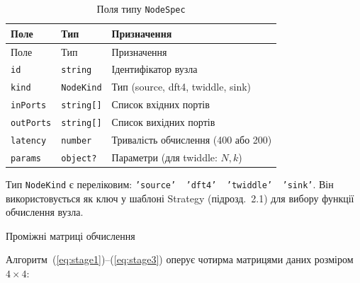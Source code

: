 \begin{longtable}[]{@{}
  >{\raggedright\arraybackslash}p{}
  >{\raggedright\arraybackslash}p{}
  >{\raggedright\arraybackslash}p{}@{}}
\caption{\protect{}\label{tab:nodespec}{}Поля типу
\protect\texttt{NodeSpec}}\tabularnewline
\toprule\noalign{}
\begin{minipage}[b]{\linewidth}\raggedright
Поле
\end{minipage} & \begin{minipage}[b]{\linewidth}\raggedright
Тип
\end{minipage} & \begin{minipage}[b]{\linewidth}\raggedright
Призначення
\end{minipage} \\
\midrule\noalign{}
\endfirsthead
\toprule\noalign{}
\begin{minipage}[b]{\linewidth}\raggedright
Поле
\end{minipage} & \begin{minipage}[b]{\linewidth}\raggedright
Тип
\end{minipage} & \begin{minipage}[b]{\linewidth}\raggedright
Призначення
\end{minipage} \\
\midrule\noalign{}
\endhead
\bottomrule\noalign{}
\endlastfoot
\texttt{id} & \texttt{string} & Ідентифікатор вузла \\
\texttt{kind} & \texttt{NodeKind} & Тип (source, dft4, twiddle, sink) \\
\texttt{inPorts} & \texttt{string{[}{]}} & Список вхідних портів \\
\texttt{outPorts} & \texttt{string{[}{]}} & Список вихідних портів \\
\texttt{latency} & \texttt{number} & Тривалість обчислення (400 або
200) \\
\texttt{params} & \texttt{object?} & Параметри (для twiddle: \(N,k\)) \\
\end{longtable}

Тип \texttt{NodeKind} є переліковим:
\texttt{’source’\ \textbar{}\ ’dft4’\ \textbar{}\ ’twiddle’\ \textbar{}\ ’sink’}.
Він використовується як ключ у шаблоні Strategy (підрозд.~2.1) для
вибору функції обчислення вузла.

Проміжні матриці обчислення

Алгоритм~(\hyperref[eq:stage1]{{[}eq:stage1{]}})--(\hyperref[eq:stage3]{{[}eq:stage3{]}})
оперує чотирма матрицями даних розміром \(4 \times 4\):

